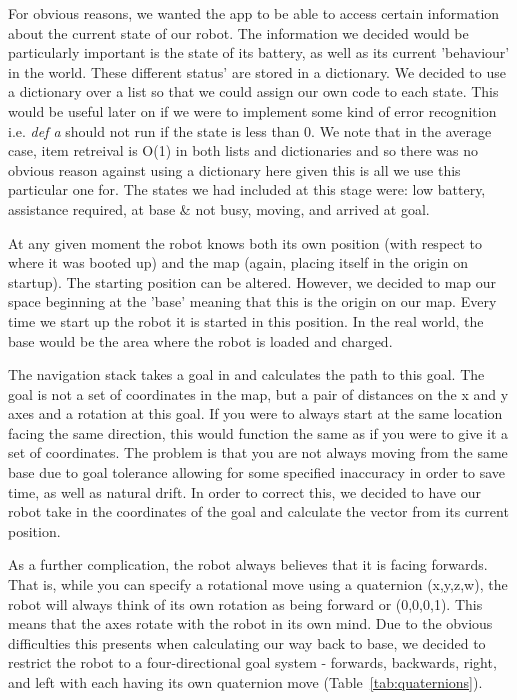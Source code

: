 \documentclass{article}
\begin{document}
For obvious reasons, we wanted the app to be able to access certain information about the current state of our robot. The information we decided would be particularly important is the state of its battery, as well as its current 'behaviour' in the world. These different status' are stored in a dictionary. We decided to use a dictionary over a list so that we could assign our own code to each state. This would be useful later on if we were to implement some kind of error recognition i.e. {\it def a} should not run if the state is less than 0. We note that in the average case, item retreival is O(1) in both lists and dictionaries and so there was no obvious reason against using a dictionary here given this is all we use this particular one for. The states we had included at this stage were: low battery, assistance required, at base \& not busy, moving, and arrived at goal.

At any given moment the robot knows both its own position (with respect to where it was booted up) and the map (again, placing itself in the origin on startup). The starting position can be altered. However, we decided to map our space beginning at the 'base' meaning that this is the origin on our map. Every time we start up the robot it is started in this position. In the real world, the base would be the area where the robot is loaded and charged.

The navigation stack takes a goal in and calculates the path to this goal. The goal is not a set of coordinates in the map, but a pair of distances on the x and y axes and a rotation at this goal. If you were to always start at the same location facing the same direction, this would function the same as if you were to give it a set of coordinates. The problem is that you are not always moving from the same base due to goal tolerance allowing for some specified inaccuracy in order to save time, as well as natural drift. In order to correct this, we decided to have our robot take in the coordinates of the goal and calculate the vector from its current position.

As a further complication, the robot always believes that it is facing forwards. That is, while you can specify a rotational move using a quaternion (x,y,z,w), the robot will always think of its own rotation as being forward or (0,0,0,1). This means that the axes rotate with the robot in its own mind. Due to the obvious difficulties this presents when calculating our way back to base, we decided to restrict the robot to a four-directional goal system - forwards, backwards, right, and left with each having its own quaternion move (Table~\ref{tab:quaternions}).
\end{document}
